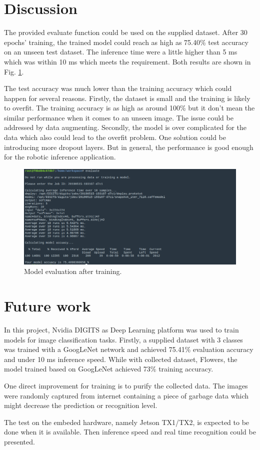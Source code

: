 \documentclass[10pt,journal,compsoc]{IEEEtran}
\begin{document}
\section{Discussion}

The provided evaluate function could be used on the supplied dataset. After 30 epochs' training, the trained model could reach as high as 75.40\% test accuracy on an unseen test dataset. The inference time were a little higher than 5 ms which was within 10 ms which meets the requirement. Both results are shown in Fig. \ref{fig:supplied-evaluate}.

The test accuracy was much lower than the training accuracy which could happen for several reasons. Firstly, the dataset is small and the training is likely to overfit. The training accuracy is as high as around 100\% but it don't mean the similar performance when it comes to an unseen image. The issue could be addressed by data augmenting. Secondly, the model is over complicated for the data which also could lead to the overfit problem. One solution could be introducing more dropout layers. But in general, the performance is good enough for the robotic inference application.

\begin{figure}[thpb]
      \centering
      \includegraphics[width=\linewidth]{images/evaluate_screenshot.png}
      \caption{Model evaluation after training.}
      \label{fig:supplied-evaluate}
\end{figure}

\section{Future work}
In this project, Nvidia DIGITS as Deep Learning platform was used to train models for image classification tasks. Firstly, a supplied dataset with 3 classes was trained with a GoogLeNet network and achieved 75.41\% evaluation accuracy and under 10 ms inference speed. While with collected dataset, Flowers, the model trained based on GoogLeNet achieved 73\% training accuracy.

One direct improvement for training is to purify the collected data. The images were randomly captured from internet containing a piece of garbage data which might decrease the prediction or recognition level.

The test on the embeded hardware, namely Jetson TX1/TX2, is expected to be done when it is available. Then inference speed and real time recognition could be presented.



\end{document}
